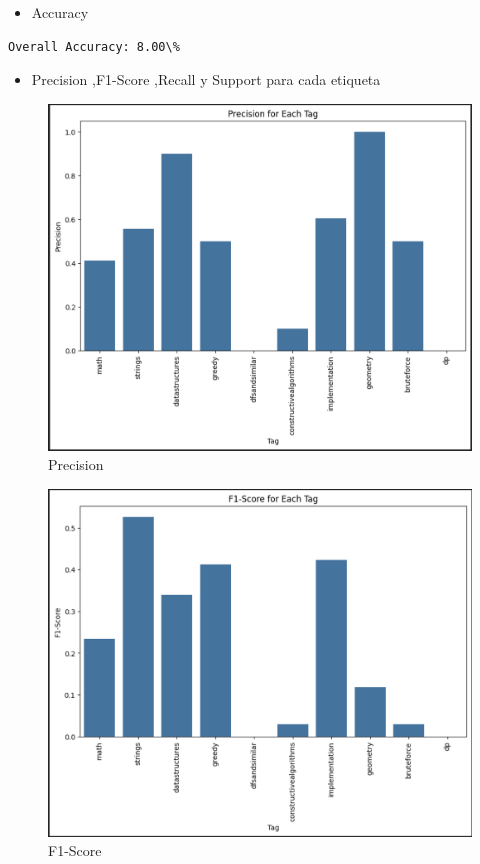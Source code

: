 \documentclass{article}
\begin{document}
\begin{itemize}
    \item Accuracy
\end{itemize}
\begin{verbatim}
Overall Accuracy: 8.00\%
\end{verbatim}

\newpage
\begin{itemize}
    \item Precision ,F1-Score ,Recall y Support para cada etiqueta
\end{itemize}
\begin{figure}[H]
    \centering
    \includegraphics[scale=0.49]{imgs/precisonknn.png}
    \caption{Precision}
    \label{fig:p}
\end{figure}
\begin{figure}[H]
    \centering
    \includegraphics[scale=0.49]{imgs/f1knn.png}
    \caption{F1-Score}
    \label{fig:f1}
\end{figure}
\end{document}
